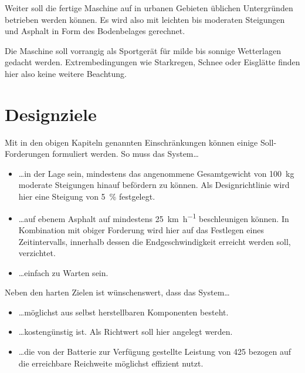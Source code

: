 			Weiter soll die fertige Maschine auf in urbanen Gebieten üblichen Untergründen betrieben werden können.
			Es wird also mit leichten bis moderaten Steigungen und Asphalt in Form des Bodenbelages gerechnet.\par\medskip
			Die Maschine soll vorrangig als Sportgerät für milde bis sonnige Wetterlagen gedacht werden.
			Extrembedingungen wie Starkregen, Schnee oder Eisglätte finden hier also keine weitere Beachtung.

	\section{Designziele}
		Mit in den obigen Kapiteln genannten Einschränkungen können einige Soll-Forderungen formuliert werden.
		So muss das System\ldots
		\begin{itemize}
			\item \ldots in der Lage sein, mindestens das angenommene Gesamtgewicht von \qty{100}{\kilo\gram} moderate Steigungen hinauf befördern zu können.
			Als Designrichtlinie wird hier eine Steigung von \qty{5}{\percent} festgelegt.
			\item \ldots auf ebenem Asphalt auf mindestens \qty{25}{\kilo\metre\per\hour} beschleunigen können.
			In Kombination mit obiger Forderung wird hier auf das Festlegen eines Zeitintervalls, innerhalb dessen die Endgeschwindigkeit erreicht werden soll, verzichtet.
			\item \ldots einfach zu Warten sein.
		\end{itemize}
		Neben den harten Zielen ist wünschenswert, dass das System\ldots
		\begin{itemize}
			\item \ldots möglichst aus selbst herstellbaren Komponenten besteht.
			\item \ldots kostengünstig ist.
			Als Richtwert soll hier  angelegt werden.
			\item \ldots die von der Batterie zur Verfügung gestellte Leistung von \SI{425}{\watthour} bezogen auf die erreichbare Reichweite möglichst effizient nutzt.
		\end{itemize}